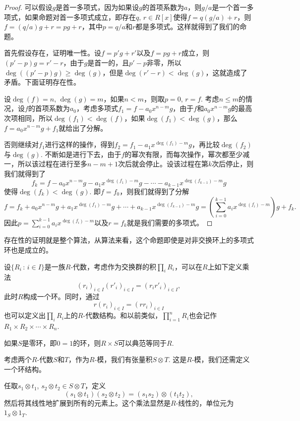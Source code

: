 \begin{proof}
	可以假设$g$是首一多项式，因为如果设$g$的首项系数为$a$，则$g/a$是一个首一多项式，如果命题对首一多项式成立，即存在$q$, $r\in R[x]$使得$f=q(g/a)+r$，则$f=(q/a)g+r=pg+r$，其中$p=q/a$和$r$都是多项式。这样就得到了我们的命题。

	首先假设存在，证明唯一性。设$f=p'g+r'$以及$f=pg+r$成立，则$(p'-p)g=r'-r$，由于$g$是首一的，且$p'-p$非零，所以$\deg((p'-p)g)\geq \deg(g)$，但是$\deg(r'-r)< \deg(g)$，这就造成了矛盾。下面证明存在性。

	设$\deg(f)=n$, $\deg(g)=m$，如果$n<m$，则取$p=0$, $r=f$. 考虑$n\leq m$的情况，设$f$的首项系数为$a_0$，考虑多项式$f_1=f-a_0x^{n-m}g$，由于$f$和$a_0x^{n-m}g$的最高次项相同，所以$\deg(f_1)<\deg(f)$，如果$\deg(f_1)<\deg(g)$，那么$f=a_0x^{n-m}g+f_1$就给出了分解。

	否则继续对$f_1$进行这样的操作，得到$f_2=f_1-a_1x^{\deg(f_1)-m}g$，再比较$\deg(f_2)$与$\deg(g)$. 不断如是进行下去，由于$f$的幂次有限，而每次操作，幂次都至少减一，所以该过程在进行至多$n-m+1$次后就会停止。设该过程在第$k$次后停止，则我们就得到了
	\[
	f_{k}=f-a_0x^{n-m}g-a_1x^{\deg(f_1)-m}g-\cdots-a_{k-1}x^{\deg(f_{k-1})-m}g
	\]
	使得$\deg(f_k)< \deg(g)$. 即$f=f_0$，则我们就得到了分解
	\[
	f=f_k+a_0x^{n-m}g+a_1x^{\deg(f_1)-m}g+\cdots+a_{k-1}x^{\deg(f_{k-1})-m}g=\left(\sum_{i=0}^{k-1}a_{i}x^{\deg(f_{i})-m}\right)g+f_k.
	\]
	因此$p=\sum_{i=0}^{k-1}a_{i}x^{\deg(f_{i})-m}$以及$r=f_k$就是我们需要的多项式。
\end{proof}

存在性的证明就是整个算法，从算法来看，这个命题即使是对非交换环上的多项式环也是成立的。

\para[$R$-代数的积]\label{alg_prod} 设$\{R_i\,:\,i\in I\}$是一族$R$-代数，考虑作为交换群的积$\prod_i R_i$，可以在$R$上如下定义乘法
\[
	(r_i)_{i\in I}(r'_i)_{i\in I}=(r_ir'_i)_{i\in I},
\]
此时$R$构成一个环。同时，通过
\[
	r(r_i)_{i\in I}=(rr_i)_{i\in I}
\]
也可以定义出$\prod_i R_i$上的$R$-代数结构。和以前类似，$\prod_{i=1}^n R_i$也会记作$R_1\times R_2\times \cdots\times R_n$. \endpara

如果$S$是零环，即$0=1$的环，则$R\times S$可以典范等同于$R$.

\para[$R$-代数的张量积] 考虑两个$R$-代数$S$和$T$，作为$R$-模，我们有张量积$S\otimes T$. 这是$R$-模，我们还需定义一个环结构。

任取$s_1\otimes t_1$, $s_2\otimes t_2\in S\otimes T$，定义
\[
	(s_1\otimes t_1)(s_2\otimes t_2)=(s_1s_2)\otimes (t_1t_2),
\]
然后将其线性地扩展到所有的元素上。这个乘法显然是$R$-线性的，单位元为$1_S\otimes 1_T$. \endpara

